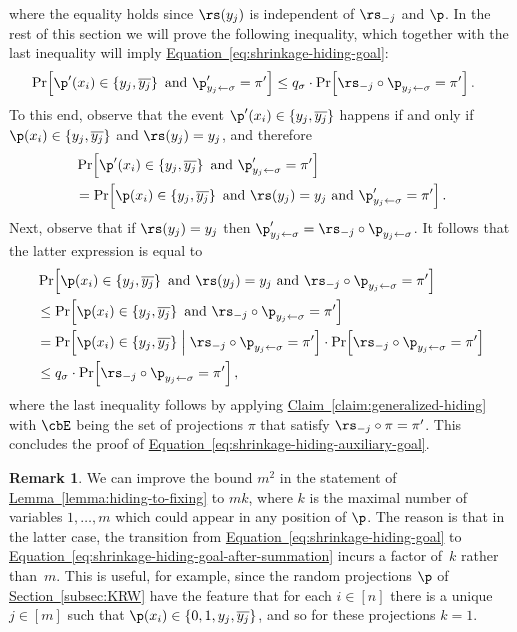 \documentclass[11pt]{article}
\numberwithin{equation}{section}
\theoremstyle{definition}
\newtheorem{remark}[theorem]{Remark}
\theoremstyle{plain}
\newcommand{\expref}[2]{\hyperref[#2]{#1~\ref{#2}}}
\theoremstyle{definition}\newtheorem{notation}[theorem]{Notation}\theoremstyle{plain}
\begin{document}
where the equality holds since $\rs(y_{j})$ is independent of $\rs_{-j}$
and $\p$. In the rest of this section we will prove the following
inequality, which together with the last inequality will imply \expref{Equation}{eq:shrinkage-hiding-goal}:
\begin{align}
\Pr\!\left[\p'(x_{i})\in\left\{ y_{j},\overline{y_{j}}\right\} \text{ and }\p_{y_{j}\gets\sigma}'=\pi'\right] & \le q_{\sigma}\cdot\Pr\!\left[\rs_{-j}\circ\p_{y_{j}\gets\sigma}=\pi'\right].\label{eq:shrinkage-hiding-auxiliary-goal}
\end{align}
To this end, observe that the event $\p'(x_{i})\in\left\{ y_{j},\overline{y_{j}}\right\} $
happens if and only if $\p(x_{i})\in\left\{ y_{j},\overline{y_{j}}\right\} $
and $\rs(y_{j})=y_{j}$, and therefore 
\begin{align*}
 & \Pr\!\left[\p'(x_{i})\in\left\{ y_{j},\overline{y_{j}}\right\} \text{ and }\p_{y_{j}\gets\sigma}'=\pi'\right]\\
 & =\Pr\!\left[\p(x_{i})\in\left\{ y_{j},\overline{y_{j}}\right\} \text{ and }\rs(y_{j})=y_{j}\text{ and }\p_{y_{j}\gets\sigma}'=\pi'\right].
\end{align*}
Next, observe that if $\rs(y_{j})=y_{j}$ then $\p_{y_{j}\gets\sigma}'=\rs_{-j}\circ\p_{y_{j}\gets\sigma}$.
It follows that the latter expression is equal to 
\begin{align*}
 & \Pr\!\left[\p(x_{i})\in\left\{ y_{j},\overline{y_{j}}\right\} \text{ and }\rs(y_{j})=y_{j}\text{ and }\rs_{-j}\circ\p_{y_{j}\gets\sigma}=\pi'\right]\\
 & \le\Pr\!\left[\p(x_{i})\in\left\{ y_{j},\overline{y_{j}}\right\} \text{ and }\rs_{-j}\circ\p_{y_{j}\gets\sigma}=\pi'\right]\\
 & =\Pr\!\left[\p(x_{i})\in\left\{ y_{j},\overline{y_{j}}\right\} \;\middle|\;\rs_{-j}\circ\p_{y_{j}\gets\sigma}=\pi'\right]\cdot\Pr\!\left[\rs_{-j}\circ\p_{y_{j}\gets\sigma}=\pi'\right]\\
 & \le q_{\sigma}\cdot\Pr\!\left[\rs_{-j}\circ\p_{y_{j}\gets\sigma}=\pi'\right],
\end{align*}
where the last inequality follows by applying \expref{Claim}{claim:generalized-hiding}
with $\cbE$ being the set of projections $\pi$ that satisfy $\rs_{-j}\circ\pi=\pi'$.
This concludes the proof of \expref{Equation}{eq:shrinkage-hiding-auxiliary-goal}.
\begin{remark}
We can improve the bound $m^{2}$ in the statement of \expref{Lemma}{lemma:hiding-to-fixing}
to $mk$, where $k$ is the maximal number of variables $1,\ldots,m$
which could appear in any position of $\p$. The reason is that in
the latter case, the transition from \expref{Equation}{eq:shrinkage-hiding-goal}
to \expref{Equation}{eq:shrinkage-hiding-goal-after-summation} incurs a factor
of~$k$ rather than~$m$. This is useful, for example, since the
random projections $\p$ of \expref{Section}{subsec:KRW} have the feature that
for each $i\in[n]$ there is a unique $j\in[m]$ such that $\p(x_{i})\in\{0,1,y_{j},\overline{y_{j}}\}$,
and so for these projections $k=1$. 
\end{remark}
\end{document}
